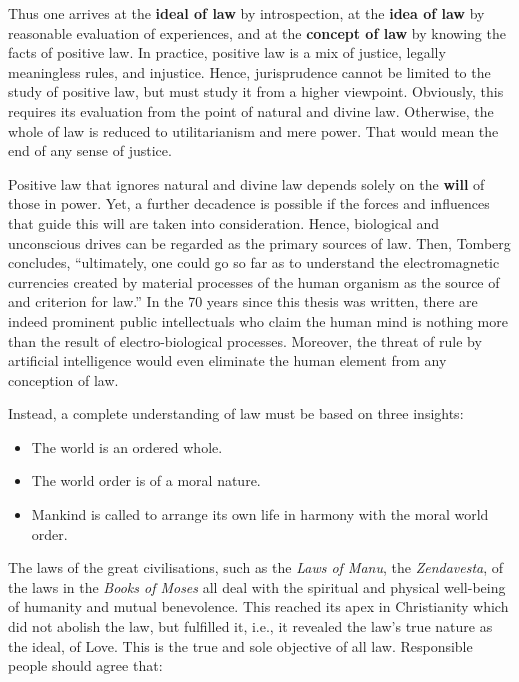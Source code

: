 Thus one arrives at the \textbf{ideal of law} by introspection, at the \textbf{idea of law} by reasonable evaluation of experiences, and at the \textbf{concept of law} by knowing the facts of positive law. In practice, positive law is a mix of justice, legally meaningless rules, and injustice. Hence, jurisprudence cannot be limited to the study of positive law, but must study it from a higher viewpoint. Obviously, this requires its evaluation from the point of natural and divine law. Otherwise, the whole of law is reduced to utilitarianism and mere power. That would mean the end of any sense of justice.

Positive law that ignores natural and divine law depends solely on the \textbf{will} of those in power. Yet, a further decadence is possible if the forces and influences that guide this will are taken into consideration. Hence, biological and unconscious drives can be regarded as the primary sources of law. Then, Tomberg concludes, ``ultimately, one could go so far as to understand the electromagnetic currencies created by material processes of the human organism as the source of and criterion for law.'' In the 70 years since this thesis was written, there are indeed prominent public intellectuals who claim the human mind is nothing more than the result of electro-biological processes. Moreover, the threat of rule by artificial intelligence would even eliminate the human element from any conception of law.

Instead, a complete understanding of law must be based on three insights:

\begin{itemize}


\item The world is an ordered whole.

\item The world order is of a moral nature.

\item Mankind is called to arrange its own life in harmony with the moral world order.
\end{itemize}


The laws of the great civilisations, such as the \emph{Laws of Manu}, the \emph{Zendavesta}, of the laws in the \emph{Books of Moses} all deal with the spiritual and physical well-being of humanity and mutual benevolence. This reached its apex in Christianity which did not abolish the law, but fulfilled it, i.e., it revealed the law's true nature as the ideal, of Love. This is the true and sole objective of all law. Responsible people should agree that:

